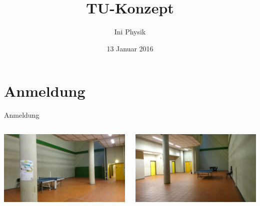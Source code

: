 \documentclass[compress,]{beamer}
\title[TU-Konzept]{TU-Konzept}
\author{Ini Physik}
\institute[TU Berlin]
\begin{document}
\subject{Konzept an der TU}
\date{13 Januar 2016}

\begin{frame}
\titlepage
\end{frame}


\frame{\tableofcontents}

\section{Anmeldung}
\begin{frame}{Anmeldung}
\end{frame}

\begin{frame}
  \begin{columns}[onlytextwidth]
    \begin{column}[0.5\textwidth]
      \includegraphics[width=\textwidth]{images/bunker1.JPG}
    \end{column}
    \begin{column}[0.5\textwidth]
      \includegraphics[width=\textwidth]{images/bunker2.JPG}
    \end{column}
  \end{columns}
\end{frame}
\end{document}
